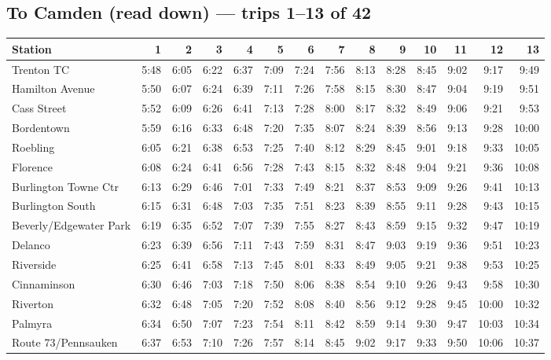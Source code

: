 \subsection*{To Camden (read down) --- trips 1--13 of 42}
\begin{center}\footnotesize\setlength{\tabcolsep}{3pt}\begin{tabular}{@{}lrrrrrrrrrrrrr@{}}\toprule
Station & 1 & 2 & 3 & 4 & 5 & 6 & 7 & 8 & 9 & 10 & 11 & 12 & 13 \\\midrule
Trenton TC & 5:48 & 6:05 & 6:22 & 6:37 & 7:09 & 7:24 & 7:56 & 8:13 & 8:28 & 8:45 & 9:02 & 9:17 & 9:49 \\
Hamilton Avenue & 5:50 & 6:07 & 6:24 & 6:39 & 7:11 & 7:26 & 7:58 & 8:15 & 8:30 & 8:47 & 9:04 & 9:19 & 9:51 \\
Cass Street & 5:52 & 6:09 & 6:26 & 6:41 & 7:13 & 7:28 & 8:00 & 8:17 & 8:32 & 8:49 & 9:06 & 9:21 & 9:53 \\
Bordentown & 5:59 & 6:16 & 6:33 & 6:48 & 7:20 & 7:35 & 8:07 & 8:24 & 8:39 & 8:56 & 9:13 & 9:28 & 10:00 \\
Roebling & 6:05 & 6:21 & 6:38 & 6:53 & 7:25 & 7:40 & 8:12 & 8:29 & 8:45 & 9:01 & 9:18 & 9:33 & 10:05 \\
Florence & 6:08 & 6:24 & 6:41 & 6:56 & 7:28 & 7:43 & 8:15 & 8:32 & 8:48 & 9:04 & 9:21 & 9:36 & 10:08 \\
Burlington Towne Ctr & 6:13 & 6:29 & 6:46 & 7:01 & 7:33 & 7:49 & 8:21 & 8:37 & 8:53 & 9:09 & 9:26 & 9:41 & 10:13 \\
Burlington South & 6:15 & 6:31 & 6:48 & 7:03 & 7:35 & 7:51 & 8:23 & 8:39 & 8:55 & 9:11 & 9:28 & 9:43 & 10:15 \\
Beverly/Edgewater Park & 6:19 & 6:35 & 6:52 & 7:07 & 7:39 & 7:55 & 8:27 & 8:43 & 8:59 & 9:15 & 9:32 & 9:47 & 10:19 \\
Delanco & 6:23 & 6:39 & 6:56 & 7:11 & 7:43 & 7:59 & 8:31 & 8:47 & 9:03 & 9:19 & 9:36 & 9:51 & 10:23 \\
Riverside & 6:25 & 6:41 & 6:58 & 7:13 & 7:45 & 8:01 & 8:33 & 8:49 & 9:05 & 9:21 & 9:38 & 9:53 & 10:25 \\
Cinnaminson & 6:30 & 6:46 & 7:03 & 7:18 & 7:50 & 8:06 & 8:38 & 8:54 & 9:10 & 9:26 & 9:43 & 9:58 & 10:30 \\
Riverton & 6:32 & 6:48 & 7:05 & 7:20 & 7:52 & 8:08 & 8:40 & 8:56 & 9:12 & 9:28 & 9:45 & 10:00 & 10:32 \\
Palmyra & 6:34 & 6:50 & 7:07 & 7:23 & 7:54 & 8:11 & 8:42 & 8:59 & 9:14 & 9:30 & 9:47 & 10:03 & 10:34 \\
Route 73/Pennsauken & 6:37 & 6:53 & 7:10 & 7:26 & 7:57 & 8:14 & 8:45 & 9:02 & 9:17 & 9:33 & 9:50 & 10:06 & 10:37 \\

\end{tabular}
\end{center}
